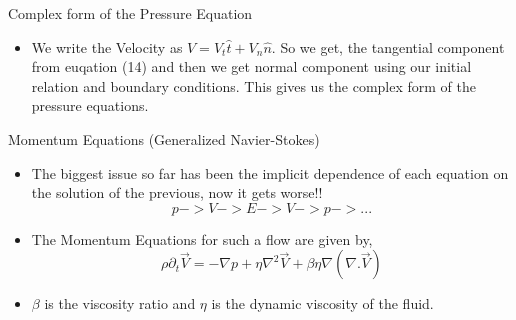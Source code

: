 \documentclass{beamer}
\begin{document}
\begin{frame}{Complex form of the Pressure Equation}


\begin{itemize}

\item We write the Velocity as $V = V_t \hat{t} + V_n \hat{n}$. So we get, the tangential component from euqation (14) and then we get normal component using our initial relation and boundary conditions. This gives us the complex form of the pressure equations.

\end{itemize}
\end{frame}

\begin{frame}{Momentum Equations (Generalized Navier-Stokes)}

\begin{itemize}

\item The biggest issue so far has been the implicit dependence of each equation on the solution of the previous, now it gets worse!!\begin{equation}
p -> V -> E -> V -> p -> ...
\end{equation}

\item The Momentum Equations for such a flow are given by,
\begin{equation}
\rho \partial_t \vec{V} = -\nabla p + \eta \nabla^2 \vec{V} + \beta \eta \nabla(\nabla . \vec{V})
\end{equation}

\item $\beta$ is the viscosity ratio and $\eta$ is the dynamic viscosity of the fluid.

\end{itemize}

\end{frame}
\end{document}
